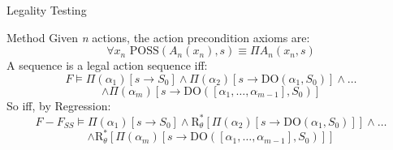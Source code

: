 \begin{frame}{Legality Testing}
\begin{block}{Method}
Given \textit{n} actions, the action precondition axioms are:
    \[ \forall x_n \text{ POSS}(A_n(x_n), s) \equiv \Pi A_n(x_n, s) \]
A sequence is a legal action sequence iff:     
    \[ \textit{F} \models \Pi(\alpha_1)[s \rightarrow S_0] \land \Pi(\alpha_2)[s \rightarrow \text{DO}(\alpha_1, S_0)] \land \ldots \]
    \[ \land \Pi(\alpha_m)[s \rightarrow \text{DO}([\alpha_1, \ldots, \alpha_{m-1}], S_0)] \]
So iff, by Regression:
    \[ \textit{F} - \textit{F}_{\textit{SS}} \models \Pi(\alpha_1)[s \rightarrow S_0] \land \text{R}^*_{\theta}[\Pi(\alpha_2)[s \rightarrow \text{DO}(\alpha_1, S_0)]] \land \ldots \]
    \[ \land \text{R}^*_{\theta}[\Pi(\alpha_m)[s \rightarrow \text{DO}([\alpha_1, \ldots, \alpha_{m-1}], S_0)]] \]
\end{block}
\end{frame}


